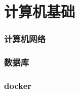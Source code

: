 \documentclass{paper}
\begin{document}
	\part{计算机基础}
	\section{计算机网络}
	\section{数据库}
	\section{docker}
\end{document}
